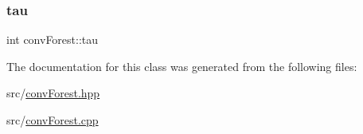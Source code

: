 \mbox{\label{classconvForest_a390216111823cd05c48aad3a358a49a7}} 
\subsubsection{\texorpdfstring{tau}{tau}}
{\footnotesize\ttfamily int conv\+Forest\+::tau\hspace{0.3cm}{\ttfamily [private]}}



The documentation for this class was generated from the following files\+:\begin{DoxyCompactItemize}
\item 
src/\hyperlink{convForest_8hpp}{conv\+Forest.\+hpp}\item 
src/\hyperlink{convForest_8cpp}{conv\+Forest.\+cpp}\end{DoxyCompactItemize}
